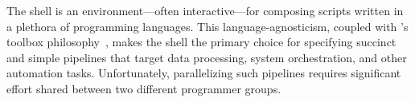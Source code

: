 \documentclass[letterpaper,twocolumn,10pt]{article}
\newcommand{\kk}[1]{[{\color{magenta}kk: #1}]}
\begin{document}


%
% 
% 

The \unix shell is an environment---often interactive---for composing scripts written in a plethora of programming languages.
This language-agnosticism, coupled with \unix's toolbox philosophy~\cite{mcilroy1978unix}, makes the shell the primary choice for specifying succinct and simple pipelines that target data processing, system orchestration, and other automation tasks.
Unfortunately, parallelizing such pipelines requires significant effort shared between two different programmer groups. %
\end{document}
